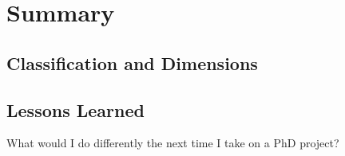 
\chapter[Summary]{Summary}\label{chap:summary}


\section{Classification and Dimensions}


\section{Lessons Learned}
What would I do differently the next time I take on a PhD project?

